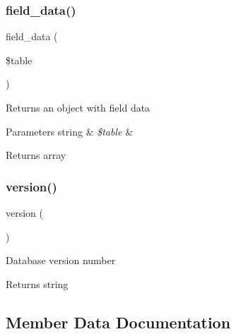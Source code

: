 \subsubsection{\texorpdfstring{field\+\_\+data()}{field\_data()}}
{\footnotesize\ttfamily field\+\_\+data (\begin{DoxyParamCaption}\item[{}]{\$table }\end{DoxyParamCaption})}

Returns an object with field data


\begin{DoxyParams}[1]{Parameters}
string & {\em \$table} & \\
\hline
\end{DoxyParams}
\begin{DoxyReturn}{Returns}
array 
\end{DoxyReturn}
\mbox{\label{class_c_i___d_b__pdo__oci__driver_a6080dae0886626b9a4cedb29240708b1}} 
\subsubsection{\texorpdfstring{version()}{version()}}
{\footnotesize\ttfamily version (\begin{DoxyParamCaption}{ }\end{DoxyParamCaption})}

Database version number

\begin{DoxyReturn}{Returns}
string 
\end{DoxyReturn}


\subsection{Member Data Documentation}
\mbox{\label{class_c_i___d_b__pdo__oci__driver_a06c80bac2ecbd0557827e96949c23097}} 

